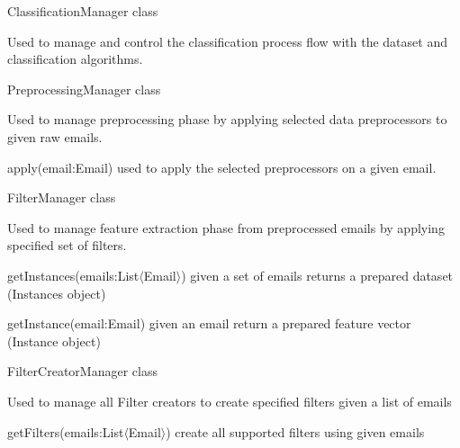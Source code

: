 \begin{my_itemize}
  \item ClassificationManager class
  \begin{my_desc}
    \item[Purpose] Used to manage and control the classification process flow
      with the dataset and classification algorithms.
  \end{my_desc}
  \item PreprocessingManager class
  \begin{my_desc}
    \item[Purpose] Used to manage preprocessing phase by applying selected data preprocessors
      to given raw emails.
    \item[Functions] \hfill
    \begin{my_itemize}
      \item apply(email:Email) used to apply the selected preprocessors on a given email.
    \end{my_itemize}
  \end{my_desc}

  \item FilterManager class
  \begin{my_desc}
    \item[Purpose] Used to manage feature extraction phase from preprocessed emails by applying
      specified set of filters.
    \item[Functions] \hfill
    \begin{my_itemize}
      \item getInstances(emails:List$\langle$Email$\rangle$) given a set of emails returns a prepared dataset (Instances object)
      \item getInstance(email:Email) given an email return a prepared feature vector (Instance object)
    \end{my_itemize}

  \end{my_desc}

  \item FilterCreatorManager class
  \begin{my_desc}
    \item[Purpose] Used to manage all Filter creators to create specified filters given a list of emails
    \item[Functions] \hfill
    \begin{my_itemize}
      \item getFilters(emails:List$\langle$Email$\rangle$) create all supported filters using given emails
    \end{my_itemize}


\end{my_desc}
\end{my_itemize}
